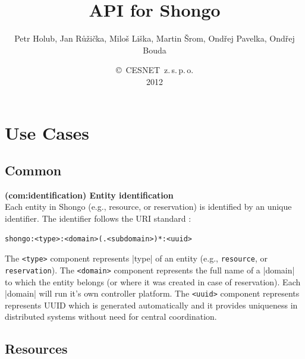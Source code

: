 \documentclass[a4paper]{report}
\makeatletter
\newcommand{\ApiValue}[1]{\verb|#1|}
\newcounter{UCcounter}
\newenvironment{UseCases}%
	{\begin{list}{\textbf{UC-\arabic{UCcounter}}}{\@nmbrlisttrue\def\@listctr{UCcounter}}}%
	{\end{list}}
\newcommand{\UClabel}[1]{\label{UC:#1}}
\newcommand{\UseCase}[2]{\item\UClabel{#2} \textbf{(#2) #1}\\ \nopagebreak}
\makeatother
\begin{document}
\title{API for Shongo}
\author{Petr Holub, Jan Růžička, Miloš Liška, Martin Šrom, Ondřej Pavelka, Ondřej Bouda}
\date{\copyright~CESNET~z.\,s.\,p.\,o.\\2012}

\maketitle

\tableofcontents

\chapter{Use Cases}

\section{Common}

\begin{UseCases}

\UseCase{Entity identification}{com:identification}
Each entity in Shongo (e.g., resource, or reservation) is identified by an unique identifier.
The identifier follows the URI standard \cite{rfc3986}:
\begin{verbatim}
shongo:<type>:<domain>(.<subdomain>)*:<uuid>
\end{verbatim}
The \ApiValue{<type>} component represents |type| of an entity (e.g., \ApiValue{resource}, or \ApiValue{reservation}). The \ApiValue{<domain>} component represents the full name of a |domain| to which the entity belongs (or where it was created in case of reservation). Each |domain| will run it's own controller platform. The \ApiValue{<uuid>} component represents represents UUID \cite{rfc4122} which is generated automatically and it provides uniqueness in distributed systems without need for central coordination.

\end{UseCases}


\section{Resources}
\end{document}
